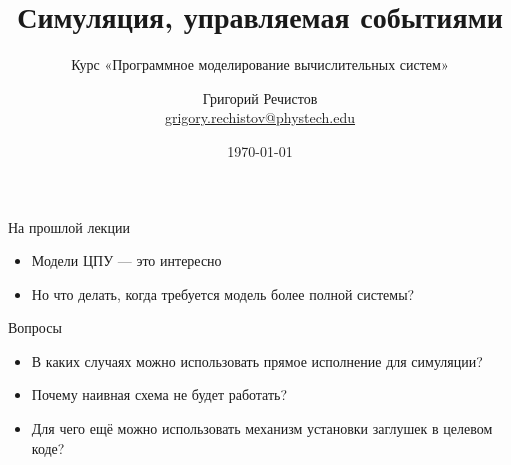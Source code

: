 \documentclass{beamer}
\title{Симуляция, управляемая событиями}
\subtitle{Курс «Программное моделирование вычислительных систем»}
\author[]{Григорий Речистов \\ \small{\href{mailto:grigory.rechistov@phystech.edu}{grigory.rechistov@phystech.edu}}}
\date{\today}
\begin{document}
\begin{frame}
    \maketitle
\end{frame}

\begin{frame}
    \tableofcontents
\end{frame}

\begin{frame}{На прошлой лекции}
\begin{itemize}
    \item Модели ЦПУ — это интересно
    \item Но что делать, когда требуется модель более полной системы?
\end{itemize}
\end{frame}

\begin{frame}{Вопросы}
\begin{itemize}
\item В каких случаях можно использовать прямое исполнение для симуляции?\pause
\item Почему наивная схема не будет работать?\pause
\item Для чего ещё можно использовать механизм установки заглушек в целевом коде?
\end{itemize}

\end{frame}
\end{document}
